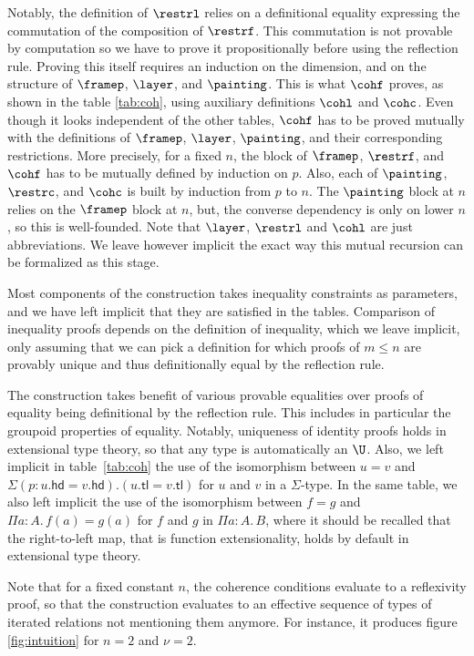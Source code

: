 \documentclass[10pt]{art.cls/art}
\newcommand{\tl}{\ensuremath{\mathsf{tl}}}
\newcommand{\hd}{\ensuremath{\mathsf{hd}}}
\begin{document}
Notably, the definition of $\restrl$ relies on a definitional equality expressing the commutation of the composition of $\restrf$. This commutation is not provable by computation so we have to prove it propositionally before using the reflection rule. Proving this itself requires an induction on the dimension, and on the structure of $\framep$, $\layer$, and $\painting$. This is what $\cohf$ proves, as shown in the table \ref{tab:coh}, using auxiliary definitions $\cohl$ and $\cohc$. Even though it looks independent of the other tables, $\cohf$ has to be proved mutually with the definitions of $\framep$, $\layer$, $\painting$, and their corresponding restrictions. More precisely, for a fixed $n$, the block of $\framep$, $\restrf$, and $\cohf$ has to be mutually defined by induction on $p$. Also, each of $\painting$, $\restrc$, and $\cohc$ is built by induction from $p$ to $n$. The $\painting$ block at $n$ relies on the $\framep$ block at $n$, but, the converse dependency is only on lower $n$, so this is well-founded. Note that $\layer$, $\restrl$ and $\cohl$ are just abbreviations. We leave however implicit the exact way this mutual recursion can be formalized as this stage.

Most components of the construction takes inequality constraints as parameters, and we have left implicit that they are satisfied in the tables. Comparison of inequality proofs depends on the definition of inequality, which we leave implicit, only assuming that we can pick a definition for which proofs of $m \leq n$ are provably unique and thus definitionally equal by the reflection rule.

The construction takes benefit of various provable equalities over proofs of equality being definitional by the reflection rule. This includes in particular the groupoid properties of equality. Notably, uniqueness of identity proofs holds in extensional type theory, so that any type is automatically an $\U$. Also, we left implicit in table~\ref{tab:coh} the use of the isomorphism between $u = v$ and $\Sigma (p:u.\hd = v.\hd). (u.\tl = v.\tl)$ for $u$ and $v$ in a $\Sigma$-type. In the same table, we also left implicit the use of the isomorphism between $f = g$ and $\Pi a: A.\, f(a) = g(a)$ for $f$ and $g$ in $\Pi a: A.\, B$, where it should be recalled that the right-to-left map, that is function extensionality, holds by default in extensional type theory.

Note that for a fixed constant $n$, the coherence conditions evaluate to a reflexivity proof, so that the construction evaluates to an effective sequence of types of iterated relations not mentioning them anymore. For instance, it produces figure \ref{fig:intuition} for $n=2$ and $\nu=2$.
\end{document}
